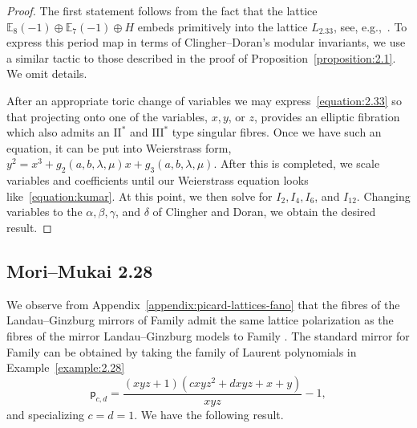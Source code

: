 \documentclass[10pt]{amsart}
\numberwithin{equation}{section}
\theoremstyle{plain}
\theoremstyle{definition}
\theoremstyle{remark}
\begin{document}
\begin{proof}
  The first statement follows from the fact that the lattice \(\mathbb{E}_8(-1)\oplus \mathbb{E}_7(-1)\oplus H\) embeds primitively into the lattice \(L_{2.33}\), see, e.g.,~\cite{kumar2015hilbert}. To express this period map in terms of Clingher--Doran's modular invariants, we use a similar tactic to those described in the proof of Proposition~\ref{proposition:2.1}. We omit details.

  After an appropriate toric change of variables we may express~\eqref{equation:2.33} so that projecting onto one of the variables, \(x,y\), or \(z\), provides an elliptic fibration which also admits an \(\mathrm{II}^*\) and \(\mathrm{III}^*\) type singular fibres. Once we have such an equation, it can be put into Weierstrass form, \(y^2 = x^3 + g_2(a,b,\lambda,\mu)x + g_3(a,b,\lambda,\mu)\). After this is completed, we scale variables and coefficients until our Weierstrass equation looks like~\eqref{equation:kumar}. At this point, we then solve for \(I_2,I_4,I_6\), and \(I_{12}\). Changing variables to the \(\alpha,\beta,\gamma\), and \(\delta\) of Clingher and Doran, we obtain the desired result.
\end{proof}

\subsection{Mori--Mukai 2.28}\label{subsection:mm228}

We observe from Appendix~\ref{appendix:picard-lattices-fano} that the fibres of the Landau--Ginzburg mirrors of Family  admit the same lattice polarization as the fibres of the mirror Landau--Ginzburg models to Family . The standard mirror for Family  can be obtained by taking the family of Laurent polynomials in Example~\ref{example:2.28}
\begin{equation}\label{equation:pcd}
  \mathsf{p}_{c,d} = \dfrac{(xyz + 1) (cxyz^2 + dxyz + x + y)}{xyz} - 1,
\end{equation}
and specializing \(c=d=1\). We have the following result.
\end{document}
